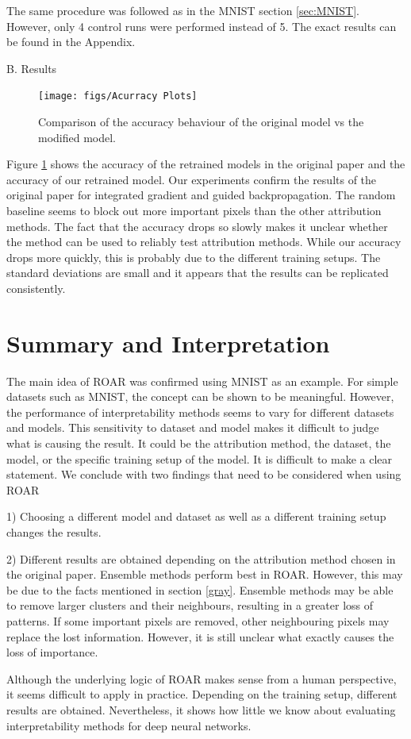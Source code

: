 The same procedure was followed as in the MNIST section \ref{sec:MNIST}. However, only 4 control runs were performed instead of 5. The exact results can be found in the Appendix.

B. Results

\begin{figure}[H]
	\centering
	\texttt{[image: figs/Acurracy Plots]}
	\caption {Comparison of the accuracy behaviour of the original model vs the modified model.}
	\label{fig:food101Res}
\end{figure}

Figure \ref{fig:food101Res} shows the accuracy of the retrained models in the original paper and the accuracy of our retrained model. Our experiments confirm the results of the original paper for integrated gradient and guided backpropagation. The random baseline seems to block out more important pixels than the other attribution methods. The fact that the accuracy drops so slowly makes it unclear whether the method can be used to reliably test attribution methods. While our accuracy drops more quickly, this is probably due to the different training setups. The standard deviations are small and it appears that the results can be replicated consistently.

\section{Summary and Interpretation}

The main idea of ROAR was confirmed using MNIST as an example. For simple datasets such as MNIST, the concept can be shown to be meaningful. However, the performance of interpretability methods seems to vary for different datasets and models. This sensitivity to dataset and model makes it difficult to judge what is causing the result. It could be the attribution method, the dataset, the model, or the specific training setup of the model. It is difficult to make a clear statement. We conclude with two findings that need to be considered when using ROAR

1) Choosing a different model and dataset as well as a different training setup changes the results. 

2) Different results are obtained depending on the attribution method chosen in the original paper. Ensemble methods perform best in ROAR. However, this may be due to the facts mentioned in section \ref{gray}. Ensemble methods may be able to remove larger clusters and their neighbours, resulting in a greater loss of patterns. If some important pixels are removed, other neighbouring pixels may replace the lost information. However, it is still unclear what exactly causes the loss of importance.

Although the underlying logic of ROAR makes sense from a human perspective, it seems difficult to apply in practice. Depending on the training setup, different results are obtained. Nevertheless, it shows how little we know about evaluating interpretability methods for deep neural networks.


